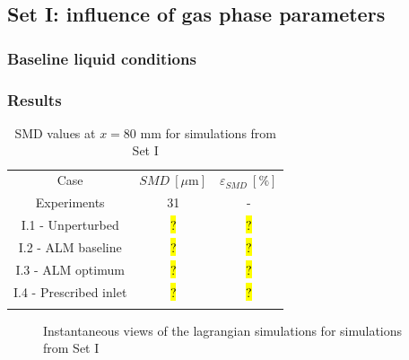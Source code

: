 \clearpage


\subsection{Set I: influence of gas phase parameters}

\subsubsection{Baseline liquid conditions}

\subsubsection{Results}

\begin{table}[!h]
\centering
\caption{SMD values at $x = 80$ mm for simulations from Set I}
\begin{tabular}{ccc}
\thickhline
Case & $SMD~\left[\mu \mathrm{m} \right]$ & $\varepsilon_{SMD}~\left[\% \right]$ \\
\thickhline
Experiments & 31 & - \\
I.1 - Unperturbed & \hl{?} & \hl{?} \\
I.2 - ALM baseline & \hl{?} & \hl{?} \\
I.3 - ALM optimum & \hl{?} & \hl{?} \\
I.4 - Prescribed inlet & \hl{?} & \hl{?} \\
\thickhline
\end{tabular}
\label{tab:jicf_tools_trajectories_obtention}
\end{table}

\begin{figure}[ht]
\centering
{}
\caption{Instantaneous views of the lagrangian simulations for simulations from Set I}
\end{figure}



